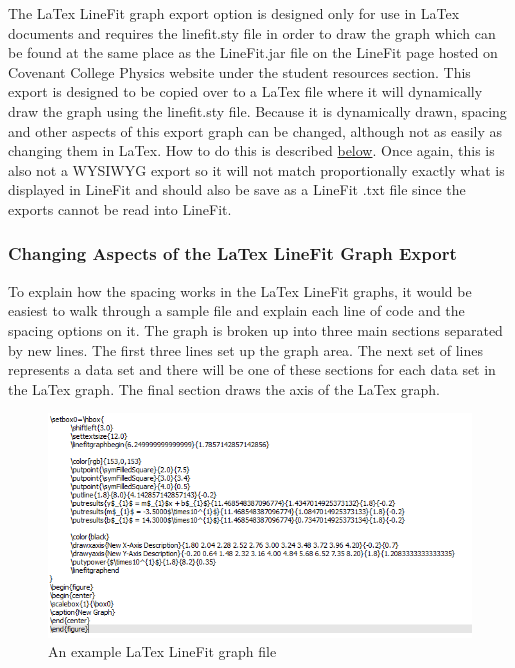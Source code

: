 \documentclass[titlepage,12pt]{article}
\begin{document}
The LaTex LineFit graph export option is designed only for use in LaTex documents and requires the linefit.sty file in order to draw the graph which can be found at the same place as the LineFit.jar file on the LineFit page hosted on Covenant College Physics website under the student resources section. This export is designed to be copied over to a LaTex file where it will dynamically draw the graph using the linefit.sty file. Because it is dynamically drawn, spacing and other aspects of this export graph can be changed, although not as easily as changing them in LaTex. How to do this is described \hyperref[sec:exlatexspac]{below}. Once again, this is also not a WYSIWYG export so it will not match proportionally exactly what is displayed in LineFit and should also be save as a LineFit .txt file since the exports cannot be read into LineFit.



\subsubsection{Changing Aspects of the LaTex LineFit Graph Export}
\label{sec:exlatexspace}

To explain how the spacing works in the LaTex LineFit graphs, it would be easiest to walk through a sample file and explain each line of code and the spacing options on it. The graph is broken up into three main sections separated by new lines. The first three lines set up the graph area. The next set of lines represents a data set and there will be one of these sections for each data set in the LaTex graph. The final section draws the axis of the LaTex graph.

\begin{figure}[ht!]
\centering
\includegraphics[width=14cm]{images/latexFile.png}
\caption{An example LaTex LineFit graph file}
\end{figure}
\end{document}
